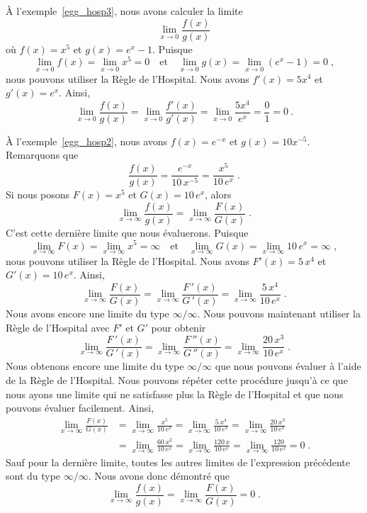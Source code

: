 {\begin{egg}
À l'exemple~\ref{egg_hosp3}, nous avons calculer la limite
\[
\lim_{x\rightarrow 0} \frac{f(x)}{g(x)}
\]
où $f(x) = x^5$ et $g(x) = e^x - 1$.  Puisque
\[
\lim_{x\rightarrow 0} f(x) = \lim_{x\rightarrow 0} x^5 = 0 \quad \text{et}
\quad  \lim_{x\rightarrow 0} g(x) = \lim_{x\rightarrow 0} (e^x - 1) = 0 \; ,
\]
nous pouvons utiliser la Règle de l'Hospital.  Nous avons $f'(x) = 5x^4$ et
$g'(x) = e^x$.  Ainsi,
\[
\lim_{x\rightarrow 0} \frac{f(x)}{g(x)}
= \lim_{x\rightarrow 0} \frac{f'(x)}{g'(x)}
= \lim_{x\rightarrow 0} \frac{5x^4}{e^x} = \frac{0}{1} = 0 \ .
\]
\end{egg}

\begin{egg}
À l'exemple~\ref{egg_hosp2}, nous avons $f(x) = e^{-x}$ et
$g(x)= 10x^{-5}$.  Remarquons que
\[
\frac{f(x)}{g(x)} = \frac{e^{-x}}{10\,x^{-5}} = \frac{x^5}{10\,e^x} \;.
\]
Si nous posons $F(x) = x^5$ et $G(x)=10\,e^x$, alors
\[
\lim_{x\rightarrow \infty} \frac{f(x)}{g(x)}
= \lim_{x\rightarrow \infty} \frac{F(x)}{G(x)}
\; .
\]
C'est cette dernière limite que nous évaluerons.  Puisque
\[
\lim_{x\rightarrow \infty} F(x) = \lim_{x\rightarrow \infty} x^5 = \infty
\quad \text{et} \quad
\lim_{x\rightarrow \infty} G(x) = \lim_{x\rightarrow \infty} 10\,e^x = \infty \; ,
\]
nous pouvons utiliser la Règle de l'Hospital.  Nous avons $F'(x) = 5\,x^4$ et
$G'(x) = 10\,e^x$.  Ainsi,
\[
\lim_{x\rightarrow \infty} \frac{F(x)}{G(x)}
= \lim_{x\rightarrow \infty} \frac{F\,'(x)}{G\,'(x)}
= \lim_{x\rightarrow \infty} \frac{5\,x^4}{10\,e^x} \; .
\]
Nous avons encore une limite du type $\infty/\infty$.  Nous pouvons maintenant
utiliser la Règle de l'Hospital avec $F'$ et $G'$ pour obtenir
\[
\lim_{x\rightarrow \infty} \frac{F\,'(x)}{G\,'(x)}
= \lim_{x\rightarrow \infty} \frac{F\,''(x)}{G\,''(x)}
= \lim_{x\rightarrow \infty} \frac{20\,x^3}{10\,e^x} \; .
\]
Nous obtenons encore une limite du type $\infty/\infty$ que nous
pouvons évaluer à l'aide de la Règle de l'Hospital.  Nous pouvons
répéter cette procédure jusqu'à ce que nous ayons une limite qui ne
satisfasse plus la Règle de l'Hospital et que nous pouvons évaluer
facilement.  Ainsi,
\begin{align*}
\lim_{x\rightarrow \infty} \frac{F(x)}{G(x)}
&= \lim_{x\rightarrow \infty} \frac{x^5}{10\,e^x}
= \lim_{x\rightarrow \infty} \frac{5\,x^4}{10\,e^x}
= \lim_{x\rightarrow \infty} \frac{20\,x^3}{10\,e^x} \\
&= \lim_{x\rightarrow \infty} \frac{60\,x^2}{10\,e^x}
= \lim_{x\rightarrow \infty} \frac{120\,x}{10\,e^x}
= \lim_{x\rightarrow \infty} \frac{120}{10\,e^x} = 0 \; .
\end{align*}
Sauf pour la dernière limite, toutes les autres limites de
l'expression précédente sont du type $\infty/\infty$.  Nous avons donc
démontré que
\[
\lim_{x\rightarrow \infty} \frac{f(x)}{g(x)}
= \lim_{x\rightarrow \infty} \frac{F(x)}{G(x)} = 0 \; .
\]
\end{egg}

}
